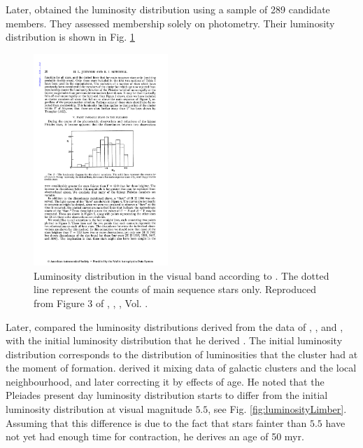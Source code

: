 Later, \citet{Johnson1958} obtained the luminosity distribution using a sample of 289 candidate members. They assessed  membership solely on photometry. Their luminosity distribution is shown in Fig. \ref{fig:luminosityJohnson}

\begin{figure}[ht!]
\begin{center}
\includegraphics[height=8cm]{background/Figures/F3_Johnson1958.pdf}
\caption{Luminosity distribution in the visual band according to \citet{Johnson1958}. The dotted line represent the counts of main sequence stars only. Reproduced from Figure 3 of \citet{Johnson1958}, \textit{}, , Vol. .}
\label{fig:luminosityJohnson}
\end{center}
\end{figure}

Later, \citet{Limber1962} compared the luminosity distributions derived from the data of \citet{Trumpler1921}, \citet{Hertzsprung1947}, and \citet{Johnson1958}, with the initial luminosity distribution that he derived \citep{Limber1960}. The initial luminosity distribution corresponds to the distribution of luminosities that the cluster had at the moment of formation. \citet{Limber1960} derived it mixing data of galactic clusters and the local neighbourhood, and later correcting it by effects of age. He noted that the Pleiades present day luminosity distribution starts to differ from the initial luminosity distribution at visual magnitude $5.5$, see Fig. \ref{fig:luminosityLimber}. Assuming that this difference is due to the fact that stars fainter than $5.5$ have not yet had enough time for contraction, he derives an age of 50 \gls{myr}. 

